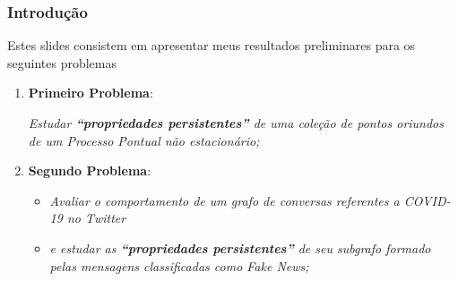 \documentclass[11pt]{beamer}
\theoremstyle{remark}
\theoremstyle{definition}
\theoremstyle{plain}
\begin{document}
    \begin{frame}
        \frametitle{}
        \maketitle
        \tableofcontents
    \end{frame}

    \begin{frame}
        \frametitle{Introdução}

        Estes slides consistem em apresentar meus resultados
        preliminares para os seguintes problemas

        \begin{enumerate}
            \item \textbf{Primeiro Problema}:
            \begin{center}
                    \emph{
                        Estudar \textbf{``propriedades persistentes''} de uma
                        coleção de pontos oriundos de um Processo
                        Pontual não estacionário;
                    }
            \end{center}

        \item \textbf{Segundo Problema}:
            \begin{center}
                \begin{itemize}
                    \item
                        \emph{
                            Avaliar o comportamento de um grafo de conversas
                            referentes a COVID-19 no Twitter
                        }
                    \item
                        \emph{ e estudar as
                            \textbf{``propriedades persistentes''} de seu subgrafo formado
                            pelas mensagens classificadas como Fake News;
                        }
                \end{itemize}
            \end{center}
        \end{enumerate}
    \end{frame}
\end{document}
